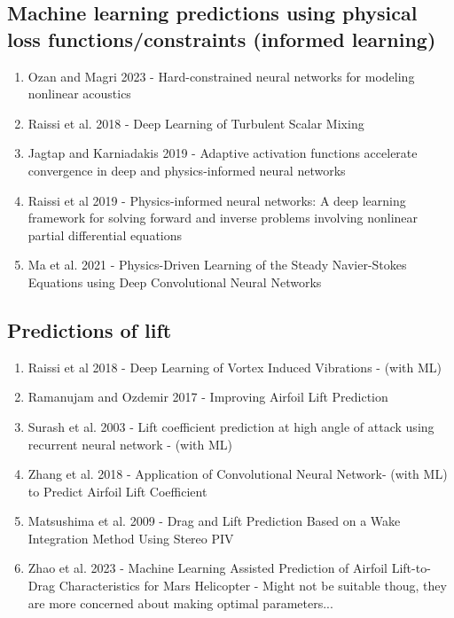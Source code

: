 \documentclass[%
 reprint,
 amsmath,amssymb,
 aps,
]{revtex4-2}
\begin{document}
\subsection{Machine learning predictions using physical loss functions/constraints (informed learning)}
\begin{enumerate}
    \item Ozan and Magri 2023 - Hard-constrained neural networks for modeling nonlinear acoustics
     \item Raissi et al. 2018 - Deep Learning of Turbulent Scalar Mixing
    \item Jagtap and Karniadakis 2019 - Adaptive activation functions accelerate convergence in deep and physics-informed neural networks
    \item Raissi et al 2019 - Physics-informed neural networks: A deep learning
    framework for solving forward and inverse problems involving nonlinear partial differential equations
    \item Ma et al. 2021 - Physics-Driven Learning of the Steady Navier-Stokes Equations using Deep Convolutional Neural Networks
\end{enumerate}

\subsection{Predictions of lift}
\begin{enumerate}
    \item Raissi et al 2018 - Deep Learning of Vortex Induced Vibrations - (with ML)
    \item Ramanujam and Ozdemir 2017 - Improving Airfoil Lift Prediction
    \item Surash et al. 2003 - Lift coefficient prediction at high angle of attack
    using recurrent neural network - (with ML)
    \item Zhang et al. 2018 - Application of Convolutional Neural Network- (with ML)
    to Predict Airfoil Lift Coefficient
    \item Matsushima et al. 2009 - Drag and Lift Prediction Based on a Wake Integration Method Using Stereo PIV
    \item Zhao et al. 2023 - Machine Learning Assisted Prediction of Airfoil Lift-to-Drag
Characteristics for Mars Helicopter  - Might not be suitable thoug, they are more concerned about making optimal parameters...
   
\end{enumerate}
\end{document}
